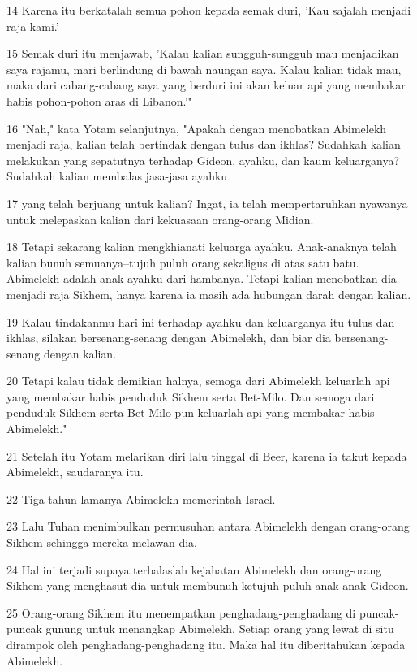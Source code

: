 \par 14 Karena itu berkatalah semua pohon kepada semak duri, 'Kau sajalah menjadi raja kami.'
\par 15 Semak duri itu menjawab, 'Kalau kalian sungguh-sungguh mau menjadikan saya rajamu, mari berlindung di bawah naungan saya. Kalau kalian tidak mau, maka dari cabang-cabang saya yang berduri ini akan keluar api yang membakar habis pohon-pohon aras di Libanon.'"
\par 16 "Nah," kata Yotam selanjutnya, "Apakah dengan menobatkan Abimelekh menjadi raja, kalian telah bertindak dengan tulus dan ikhlas? Sudahkah kalian melakukan yang sepatutnya terhadap Gideon, ayahku, dan kaum keluarganya? Sudahkah kalian membalas jasa-jasa ayahku
\par 17 yang telah berjuang untuk kalian? Ingat, ia telah mempertaruhkan nyawanya untuk melepaskan kalian dari kekuasaan orang-orang Midian.
\par 18 Tetapi sekarang kalian mengkhianati keluarga ayahku. Anak-anaknya telah kalian bunuh semuanya--tujuh puluh orang sekaligus di atas satu batu. Abimelekh adalah anak ayahku dari hambanya. Tetapi kalian menobatkan dia menjadi raja Sikhem, hanya karena ia masih ada hubungan darah dengan kalian.
\par 19 Kalau tindakanmu hari ini terhadap ayahku dan keluarganya itu tulus dan ikhlas, silakan bersenang-senang dengan Abimelekh, dan biar dia bersenang-senang dengan kalian.
\par 20 Tetapi kalau tidak demikian halnya, semoga dari Abimelekh keluarlah api yang membakar habis penduduk Sikhem serta Bet-Milo. Dan semoga dari penduduk Sikhem serta Bet-Milo pun keluarlah api yang membakar habis Abimelekh."
\par 21 Setelah itu Yotam melarikan diri lalu tinggal di Beer, karena ia takut kepada Abimelekh, saudaranya itu.
\par 22 Tiga tahun lamanya Abimelekh memerintah Israel.
\par 23 Lalu Tuhan menimbulkan permusuhan antara Abimelekh dengan orang-orang Sikhem sehingga mereka melawan dia.
\par 24 Hal ini terjadi supaya terbalaslah kejahatan Abimelekh dan orang-orang Sikhem yang menghasut dia untuk membunuh ketujuh puluh anak-anak Gideon.
\par 25 Orang-orang Sikhem itu menempatkan penghadang-penghadang di puncak-puncak gunung untuk menangkap Abimelekh. Setiap orang yang lewat di situ dirampok oleh penghadang-penghadang itu. Maka hal itu diberitahukan kepada Abimelekh.
